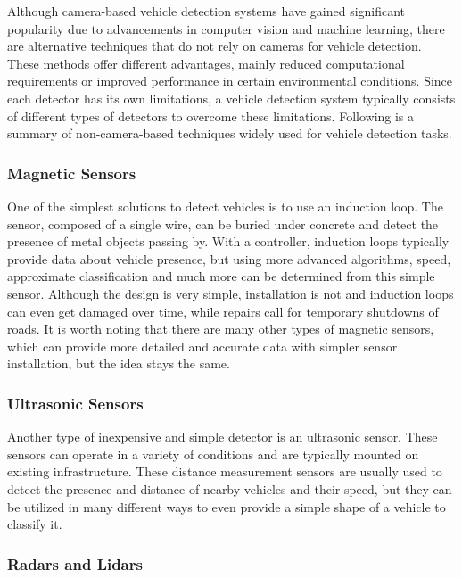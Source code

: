 Although camera-based vehicle detection systems have gained significant
popularity due to advancements in computer vision and machine learning, there
are alternative techniques that do not rely on cameras for vehicle detection.
These methods offer different advantages, mainly reduced computational
requirements or improved performance in certain environmental conditions. Since
each detector has its own limitations, a vehicle detection system typically
consists of different types of detectors to overcome these limitations.
Following is a summary of non-camera-based techniques widely used for vehicle
detection tasks.


\subsubsection*{Magnetic Sensors}

One of the simplest solutions to detect vehicles is to use an induction
loop.\cite{MagneticSensors} The sensor, composed of a single wire, can be buried
under concrete and detect the presence of metal objects passing by. With a
controller, induction loops typically provide data about vehicle presence, but
using more advanced algorithms, speed, approximate classification and much more
can be determined from this simple sensor. Although the design is very simple,
installation is not and induction loops can even get damaged over time, while
repairs call for temporary shutdowns of roads. It is worth noting that there
are many other types of magnetic sensors, which can provide more detailed and
accurate data with simpler sensor installation, but the idea stays the same.


\subsubsection*{Ultrasonic Sensors}

Another type of inexpensive and simple detector is an ultrasonic
sensor.\cite{UltrasonicSensors} These sensors can operate in a variety of
conditions and are typically mounted on existing infrastructure. These distance
measurement sensors are usually used to detect the presence and distance of nearby
vehicles and their speed, but they can be utilized in many different ways to
even provide a simple shape of a vehicle to classify it.


\subsubsection*{Radars and Lidars}

